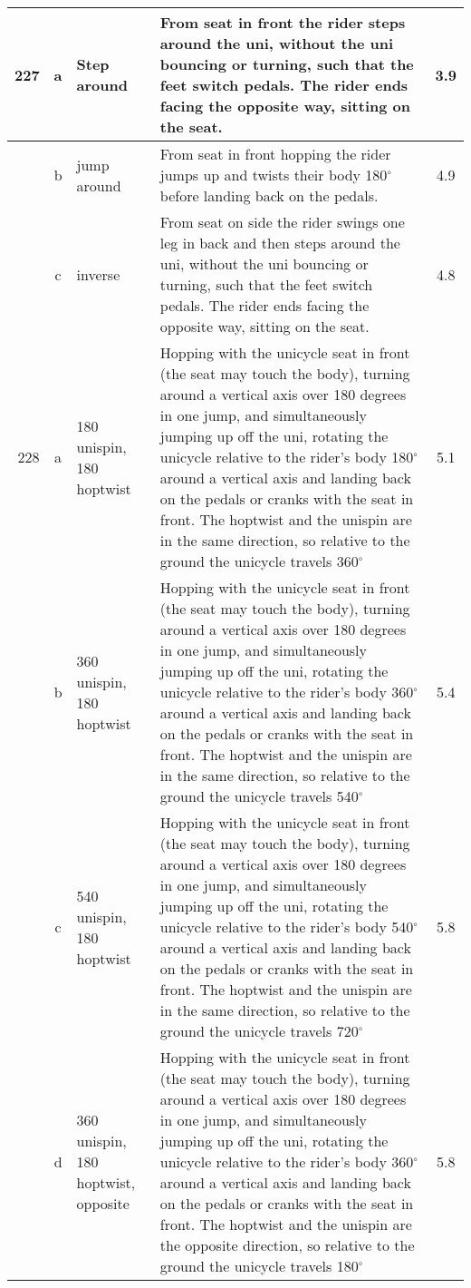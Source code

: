 \begin{longtable}{|r|c|p{4cm}|p{8cm}|c|}
\hline
227 & a & Step around & From seat in front the rider steps around the uni, without the uni bouncing or turning, such that the feet switch pedals. The rider ends facing the opposite way, sitting on the seat.  & 3.9 \\ 
\hline
  & b & jump around & From seat in front hopping the rider jumps up and twists their body 180$^\circ$ before landing back on the pedals. & 4.9 \\ 
\hline
  & c & inverse & From seat on side the rider swings one leg in back and then steps around the uni, without the uni bouncing or turning, such that the feet switch pedals. The rider ends facing the opposite way, sitting on the seat. & 4.8 \\ 
\hline
228 & a & 180 unispin, 180 hoptwist & Hopping with the unicycle seat in front (the seat may touch the body), turning around a vertical axis over 180 degrees in one jump, and simultaneously jumping up off the uni, rotating the unicycle relative to the rider's body 180$^\circ$ around a vertical axis and landing back on the pedals or cranks with the seat in front. The hoptwist and the unispin are in the same direction, so relative to the ground the unicycle travels 360$^\circ$  & 5.1 \\ 
\hline
  & b & 360 unispin, 180 hoptwist & Hopping with the unicycle seat in front (the seat may touch the body), turning around a vertical axis over 180 degrees in one jump, and simultaneously jumping up off the uni, rotating the unicycle relative to the rider's body 360$^\circ$ around a vertical axis and landing back on the pedals or cranks with the seat in front. The hoptwist and the unispin are in the same direction, so relative to the ground the unicycle travels 540$^\circ$  & 5.4 \\ 
\hline
  & c & 540 unispin, 180 hoptwist & Hopping with the unicycle seat in front (the seat may touch the body), turning around a vertical axis over 180 degrees in one jump, and simultaneously jumping up off the uni, rotating the unicycle relative to the rider's body 540$^\circ$ around a vertical axis and landing back on the pedals or cranks with the seat in front. The hoptwist and the unispin are in the same direction, so relative to the ground the unicycle travels 720$^\circ$  & 5.8 \\ 
\hline
  & d & 360 unispin, 180 hoptwist, opposite & Hopping with the unicycle seat in front (the seat may touch the body), turning around a vertical axis over 180 degrees in one jump, and simultaneously jumping up off the uni, rotating the unicycle relative to the rider's body 360$^\circ$ around a vertical axis and landing back on the pedals or cranks with the seat in front. The hoptwist and the unispin are the opposite direction, so relative to the ground the unicycle travels 180$^\circ$ & 5.8 \\ 

\end{longtable}
